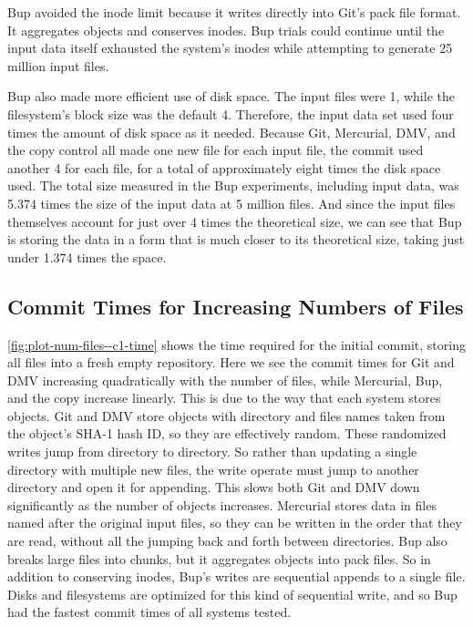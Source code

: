 Bup avoided the \gls{inode} limit because it writes directly into Git's pack file format.
It aggregates objects and conserves inodes.
Bup trials could continue until the input data itself exhausted the system's \glspl{inode} while attempting to generate \num{25} million input files.

Bup also made more efficient use of disk space.
The input files were \SI{1}{\kib}, while the filesystem's block size was the default \SI{4}{\kib}.
Therefore, the input data set used four times the amount of disk space as it needed.
Because Git, Mercurial, DMV, and the copy control all made one new file for each input file, the commit used another \SI{4}{\kib} for each file, for a total of approximately eight times the disk space used.
The total size measured in the Bup experiments, including input data, was \num{5.374} times the size of the input data at \num{5} million files.
And since the input files themselves account for just over \num{4} times the theoretical size, we can see that Bup is storing the data in a form that is much closer to its theoretical size, taking just under \num{1.374} times the space.

%


\subsection{Commit Times for Increasing Numbers of Files}

\autoref{fig:plot-num-files--c1-time} shows the time required for the initial \gls{commit}, storing all files into a fresh empty \gls{repository}.
Here we see the commit times for Git and DMV increasing quadratically with the number of files, while Mercurial, Bup, and the copy increase linearly.
This is due to the way that each system stores objects.
Git and DMV store objects with directory and files names taken from the object's SHA-1 hash ID, so they are effectively random.
These randomized writes jump from directory to directory.
So rather than updating a single directory with multiple new files, the write operate must jump to another directory and open it for appending.
This slows both Git and DMV down significantly as the number of objects increases.
Mercurial stores data in files named after the original input files, so they can be written in the order that they are read, without all the jumping back and forth between directories.
Bup also breaks large files into chunks, but it aggregates objects into pack files.
So in addition to conserving inodes, Bup's writes are sequential appends to a single file.
Disks and filesystems are optimized for this kind of sequential write, and so Bup had the fastest commit times of all systems tested.


